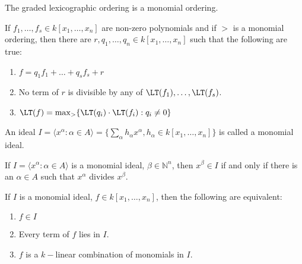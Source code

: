 \documentclass[crop=false,class=book,oneside]{standalone}
\begin{document}
            \begin{theorem}
                The graded lexicographic ordering is a monomial ordering.
            \end{theorem}
            \begin{theorem}
                If $f_1,\hdots, f_s\in k[x_1,\hdots ,x_n]$ are
                non-zero polynomials and if $>$ is a monomial ordering,
                then there are $r,q_1,\hdots, q_n\in k[x_1,\hdots ,x_n]$
                such that the following are true:
                \begin{enumerate}
                    \item $f=q_{1}f_{1}+\hdots+q_{s}f_{s}+r$
                    \item No term of $r$ is divisible by
                          any of $\LT(f_{1}),\hdots,\LT(f_{s})$.
                    \item $\LT(f)=\max_{>}\{\LT(q_{i})%
                           \cdot\LT(f_i):q_i\ne{0}\}$
                \end{enumerate}
            \end{theorem}
            \begin{definition}
                An ideal
                $I=\langle{x}^{\alpha}:\alpha\in{A}\rangle%
                  =\{\sum_{\alpha}h_{\alpha}x^\alpha,h_{\alpha}%
                   \in k[x_1,\hdots ,x_n]\}$
                is called a monomial ideal.
            \end{definition}
            \begin{theorem}
                If $I=\langle{x}^\alpha:\alpha\in{A}\rangle$
                is a monomial ideal,
                $\beta\in\mathbb{N}^n$, then $x^\beta\in{I}$
                if and only if there is an $\alpha\in{A}$
                such that $x^{\alpha}$ divides $x^{\beta}$.
            \end{theorem}
            \begin{theorem}
                If $I$ is a monomial ideal,
                $f\in{k}[x_1,\hdots ,x_n]$,
                then the following are equivalent:
                \begin{enumerate}
                    \item $f\in I$
                    \item Every term of $f$ lies in $I$.
                    \item $f$ is a $k-$linear combination of
                          monomials in $I$.
                \end{enumerate}
            \end{theorem}
\end{document}
